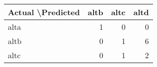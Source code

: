 \begin{tabular}{lrrr}
\toprule
Actual \textbackslash   Predicted &  altb &  altc &  altd \\
\midrule
               alta &     1 &     0 &     0 \\
               altb &     0 &     1 &     6 \\
               altc &     0 &     1 &     2 \\
\bottomrule
\end{tabular}
